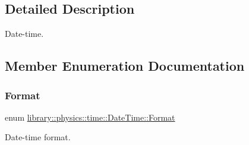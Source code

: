 \subsection{Detailed Description}
Date-\/time. 

\subsection{Member Enumeration Documentation}
\mbox{\label{classlibrary_1_1physics_1_1time_1_1_date_time_a99e6afd988c9b091b1540d707922c804}} 
\subsubsection{\texorpdfstring{Format}{Format}}
{\footnotesize\ttfamily enum \hyperlink{classlibrary_1_1physics_1_1time_1_1_date_time_a99e6afd988c9b091b1540d707922c804}{library\+::physics\+::time\+::\+Date\+Time\+::\+Format}\hspace{0.3cm}{\ttfamily [strong]}}



Date-\/time format. 

